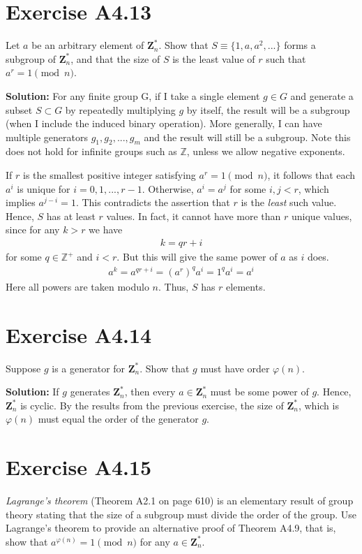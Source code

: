\documentclass{book}
\begin{document}
\section*{Exercise A4.13}
    Let $a$ be an arbitrary element of $\textbf{Z}_n^*$. Show that $S\equiv \{1,a,a^2,...\}$ forms a subgroup of $\textbf{Z}_n^*$, and that the size of $S$ is the least value of $r$ such that $a^r = 1\pmod{n}$.
    
    \textbf{Solution:} For any finite group G, if I take a single element $g\in G$ and generate a subset $S \subset G$ by repeatedly multiplying $g$ by itself, the result will be a subgroup (when I include the induced binary operation). More generally, I can have multiple generators $g_1, g_2, ..., g_m$ and the result will still be a subgroup. Note this does not hold for infinite groups such as $\mathbb{Z}$, unless we allow negative exponents.
    
    If $r$ is the smallest positive integer satisfying $a^r = 1\pmod{n}$, it follows that each $a^i$ is unique for $i=0,1,...,r-1$. Otherwise, $a^i = a^j$ for some $i,j <r$, which implies $a^{j-i}=1$. This contradicts the assertion that $r$ is the \emph{least} such value. Hence, $S$ has at least $r$ values. In fact, it cannot have more than $r$ unique values, since for any $k>r$ we have
    \begin{align}
        k = qr + i
    \end{align}
    for some $q\in\mathbb{Z}^+$ and $i<r$. But this will give the same power of $a$ as $i$ does.
    \begin{align}
        a^k = a^{qr + i} = (a^r)^q a^i = 1^q a^i = a^i
    \end{align}
    Here all powers are taken modulo $n$. Thus, $S$ has $r$ elements. 

\section*{Exercise A4.14}
    Suppose $g$ is a generator for $\textbf{Z}_n^*$. Show that $g$ must have order $\varphi(n)$.
    
    \textbf{Solution:} If $g$ generates $\textbf{Z}_n^*$, then every $a\in \textbf{Z}_n^*$ must be some power of $g$. Hence, $\textbf{Z}_n^*$ is cyclic. By the results from the previous exercise, the size of $\textbf{Z}_n^*$, which is $\varphi(n)$ must equal the order of the generator $g$.

\section*{Exercise A4.15}
    \emph{Lagrange's theorem} (Theorem A2.1 on page 610) is an elementary result of group theory stating that the size of a subgroup must divide the order of the group. Use Lagrange's theorem to provide an alternative proof of Theorem A4.9, that is, show that $a^{\varphi(n)}=1\pmod{n}$ for any $a\in \textbf{Z}_n^*$.
    
\end{document}
